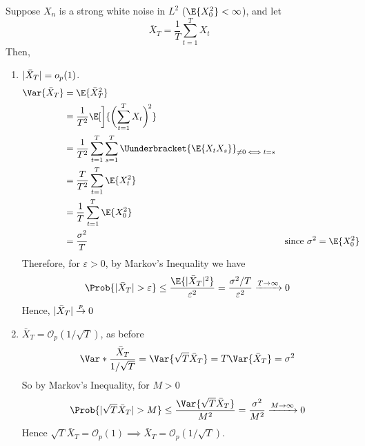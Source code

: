 \begin{Example}{}{}
    Suppose $ X_n $ is a strong white noise in $ L^2 $ ($ \E{X_0^2}<\infty $),
    and let
    \[ \bar{X}_T=\frac{1}{T} \sum_{t=1}^{T} X_t \]
    Then,
    \begin{enumerate}[(1)]
        \item $ \lvert\bar{X}_T\rvert=o_p(1) $.
              \begin{align*}
                  \Var{\bar{X}_T}
                   & =\E{\bar{X}_T^2}                                                                                                             \\
                   & =\frac{1}{T^2} \E[\bigg]{\biggl(\sum_{t=1}^{T} X_t\biggr)^{\!2}}                                                             \\
                   & =\frac{1}{T^2} \sum_{t=1}^{T} \sum_{s=1}^{T}\Uunderbracket{\E{X_t X_s}}_{\ne 0\iff t=s}                                      \\
                   & =\frac{T}{T^2} \sum_{t=1}^{T} \E{X_t^2}                                                                                      \\
                   & =\frac{1}{T} \sum_{t=1}^{T} \E{X_0^2}                                                                                        \\
                   & =\frac{\sigma^2}{T}                                                                     &  & \text{since }\sigma^2=\E{X_0^2}
              \end{align*}
              Therefore, for $ \varepsilon>0 $, by Markov's Inequality we have
              \[ \Prob{\abs{\bar{X}_T}>\varepsilon}\le \frac{\E{\abs{\bar{X}_T}^2}}{\varepsilon^2}=
                  \frac{\sigma^2/T}{\varepsilon^2}\xrightarrow{T\to\infty}0  \]
              Hence, $ \lvert\bar{X}_T\rvert\stackrel{p}{\to}0 $
        \item $ \bar{X}_T=\mathcal{O}_p(1/\sqrt{T}) $, as before
              \[ \Var*{\frac{\bar{X}_T}{1/\sqrt{T}}}=\Var{\sqrt{T}\bar{X}_T}=T\Var{\bar{X}_T}=\sigma^2 \]
              So by Markov's Inequality, for $ M>0 $
              \[ \Prob{\abs{\sqrt{T}\bar{X}_T}>M}\le \frac{\Var{\sqrt{T}\bar{X}_T}}{M^2}=\frac{\sigma^2}{M^2}
                  \xrightarrow{M\to\infty}0 \]
              Hence $ \sqrt{T}\bar{X}_T=\mathcal{O}_p(1)\implies \bar{X}_T=\mathcal{O}_p(1/\sqrt{T}) $.
    \end{enumerate}
\end{Example}
